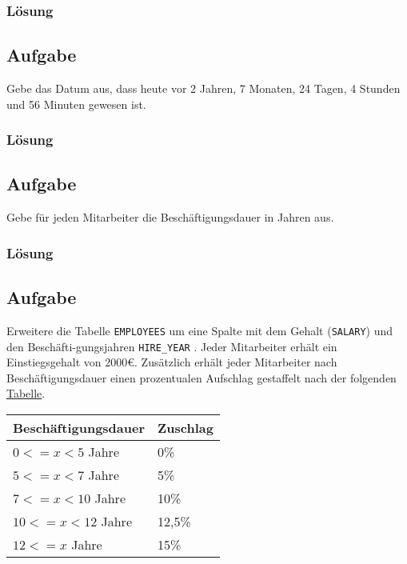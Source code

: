 \subsubsection*{Lösung}
\label{sec:uebung_03.aufgabe_09.loesung}

\subsection{Aufgabe}
\label{sec:uebung_03.aufgabe_10}
Gebe das Datum aus, dass heute vor 2 Jahren, 7 Monaten, 24 Tagen, 4 Stunden und 56 Minuten gewesen ist.

\subsubsection*{Lösung}
\label{sec:uebung_03.aufgabe_10.loesung}

\subsection{Aufgabe}
\label{sec:uebung_03.aufgabe_11}
Gebe für jeden Mitarbeiter die Beschäftigungsdauer in Jahren aus.

\subsubsection*{Lösung}
\label{sec:uebung_03.aufgabe_11.loesung}

\subsection{Aufgabe}
\label{sec:uebung_03.aufgabe_12}
Erweitere die Tabelle \texttt{EMPLOYEES} um eine Spalte mit dem Gehalt (\texttt{SALARY}) und den Beschäfti-gungsjahren \texttt{HIRE\_YEAR} . Jeder Mitarbeiter erhält ein Einstiegsgehalt von 2000\euro{}. Zusätzlich erhält jeder Mitarbeiter nach Beschäftigungsdauer einen prozentualen Aufschlag gestaffelt nach der folgenden \hyperref[tbl:uebung_03.aufgabe_12]{Tabelle}.

\begin{table}[H]
  \ttfamily
  \centering
  \begin{tabular}{l|l}
    \textbf{Beschäftigungsdauer} & \textbf{Zuschlag} \\
    \hline\hline
    $0<=x<5$ Jahre & 0\% \\
    $5<=x<7$ Jahre & 5\% \\
    $7<=x<10$ Jahre & 10\% \\
    $10<=x<12$ Jahre & 12,5\% \\
    $12<=x$ Jahre & 15\% \\
  \end{tabular}
  \label{tbl:uebung_03.aufgabe_12}
\end{table}

